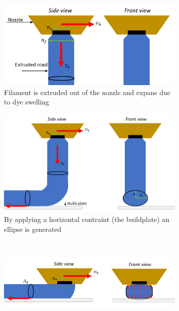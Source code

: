 \begin{figure}
\centering
  \begin{subfigure}[b]{0.6\textwidth}
    \includegraphics[width=\textwidth]{appendix_a/figures/Step1.PNG}
    \caption{Filament is extruded out of the nozzle and expans due to dye swelling}
  \end{subfigure}
  \begin{subfigure}[b]{0.6\textwidth}
    \includegraphics[width=\textwidth]{appendix_a/figures/Step2.PNG}
    \caption{By applying a horizontal contraint (the buildplate) an ellipse is generated}
  \end{subfigure}
  \\
    \begin{subfigure}[b]{0.6\textwidth}
    \includegraphics[width=\textwidth]{appendix_a/figures/Step3.PNG}

\end{subfigure}
\end{figure}
